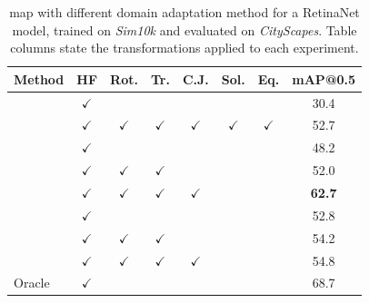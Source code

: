 \documentclass[%
    corpo=12pt,
    twoside,
    stile=classica,   
    tipotesi=magistrale,
    evenboxes,
    english,
	numerazioneromana,
]{toptesi}
\begin{document}
\begin{table}[p]
	\centering
	\caption{\gls{map} with different domain adaptation method for a RetinaNet model, trained on \textit{Sim10k} and evaluated on \textit{CityScapes}. Table columns state the transformations applied to each experiment.\label{table:retinanet}}
	\begin{NiceTabularX}{\linewidth}{Xccccccc}
		\toprule
		Method & HF & Rot. & Tr. & C.J. & Sol. & Eq. & mAP@0.5 \\
		\midrule
		 & $\checkmark$ & & & & & & 30.4   \\
		 & $\checkmark$ & $\checkmark$ & $\checkmark$ & $\checkmark$ & $\checkmark$ & $\checkmark$ & 52.7   \\
		\midrule
		 & $\checkmark$ & & & & & & 48.2   \\
		& $\checkmark$ & $\checkmark$ & $\checkmark$ & & & & 52.0   \\
		& $\checkmark$ & $\checkmark$ & $\checkmark$ & $\checkmark$ & & & \textbf{62.7}   \\
		\midrule
		 & $\checkmark$ & & & & & & 52.8   \\
		& $\checkmark$ & $\checkmark$ & $\checkmark$ & & & & 54.2   \\
		& $\checkmark$ & $\checkmark$ & $\checkmark$ & $\checkmark$ & & & 54.8   \\
		\midrule
		Oracle & $\checkmark$ & & & & & & 68.7   \\
		\bottomrule
	\end{NiceTabularX}
	

\end{table}
\end{document}
